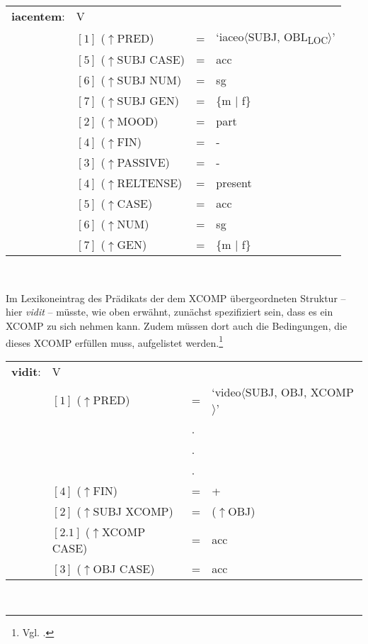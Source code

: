 \documentclass[12pt,a4paper]{article}
\begin{document}
\begin{singlespace}
\begin{tabular}{ l  l  l  l  } 
\textbf{iacentem}: & V \\ 
$\qquad$ & $[1]$ \: ($\uparrow$PRED) & = & `iaceo$\langle$SUBJ, OBL\textsubscript{LOC}$\rangle$'\\
$\qquad$ & $[5]$ \: ($\uparrow$SUBJ CASE) & = & acc \\
$\qquad$ & $[6]$ \: ($\uparrow$SUBJ NUM) & = & sg \\
$\qquad$ & $[7]$ \: ($\uparrow$SUBJ GEN) & = & \{m $\mid$ f\} \\
$\qquad$ & $[2]$ \: ($\uparrow$MOOD) & = & part\\
$\qquad$ & $[4]$ \:  ($\uparrow$FIN) & = & - \\
$\qquad$ & $[3]$ \: ($\uparrow$PASSIVE) & = & - \\
$\qquad$ & $[4]$ \: ($\uparrow$RELTENSE) & = & present \\
$\qquad$ & $[5]$ \: ($\uparrow$CASE) & = & acc \\
$\qquad$ & $[6]$ \: ($\uparrow$NUM) & = & sg \\
$\qquad$ & $[7]$ \: ($\uparrow$GEN) & = & \{m $\mid$ f\} \\

\end{tabular}\\
\newline
\end{singlespace}
Im Lexikoneintrag des Prädikats der dem XCOMP übergeordneten Struktur -- hier \textit{vidit} -- müsste, wie oben erwähnt, zunächst spezifiziert sein, dass es ein XCOMP zu sich nehmen kann. Zudem müssen dort auch die Bedingungen, die dieses XCOMP erfüllen muss, aufgelistet werden.\footnote{Vgl. \cite[56]{Skript}.} \\
\begin{singlespace}
\begin{tabular}{ l  l  l  l  } 
\textbf{vidit}: & V \\
$\qquad$ & $[1]$ \: ($\uparrow$PRED) & = & `video$\langle$SUBJ, OBJ, XCOMP$\rangle$'\\
$\qquad$ & $\qquad$ & . \\
$\qquad$ & $\qquad$ & . \\
$\qquad$ & $\qquad$ & . \\
$\qquad$ & $[4]$ \:  ($\uparrow$FIN) & = & + \\
$\qquad$ & $[2]$ \:  ($\uparrow$SUBJ XCOMP) & = & ($\uparrow$OBJ)\\
$\qquad$ & $[2.1]$ \: ($\uparrow$XCOMP CASE) & = & acc \\
$\qquad$ & $[3]$ \: ($\uparrow$OBJ CASE) & = & acc \\
\end{tabular}\\
\newline
\end{singlespace}
\end{document}
